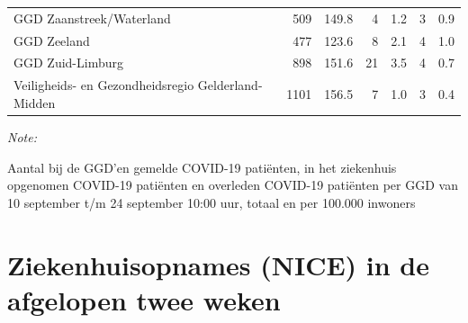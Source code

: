\documentclass[
  english,
  man,floatsintext]{apa6}
\begin{document}
\begin{table}
\begin{threeparttable}
\begin{tabular}{lrrrrrr}
GGD Zaanstreek/Waterland & 509 & 149.8 & 4 & 1.2 & 3 & 0.9\\
GGD Zeeland & 477 & 123.6 & 8 & 2.1 & 4 & 1.0\\
GGD Zuid-Limburg & 898 & 151.6 & 21 & 3.5 & 4 & 0.7\\
Veiligheids- en Gezondheidsregio Gelderland-Midden & 1101 & 156.5 & 7 & 1.0 & 3 & 0.4\\
\bottomrule
\end{tabular}
\begin{tablenotes}
\item \textit{Note: } 
\item Aantal bij de GGD’en gemelde COVID-19 patiënten, in het ziekenhuis opgenomen COVID-19 patiënten en overleden COVID-19 patiënten per GGD van 10 september t/m 24 september 10:00 uur, totaal en per 100.000 inwoners
\end{tablenotes}
\end{threeparttable}
\endgroup{}
\end{table}

\newpage

\hypertarget{ziekenhuisopnames-nice-in-de-afgelopen-twee-weken}{%
\section{Ziekenhuisopnames (NICE) in de afgelopen twee weken}\label{ziekenhuisopnames-nice-in-de-afgelopen-twee-weken}}
\end{document}
